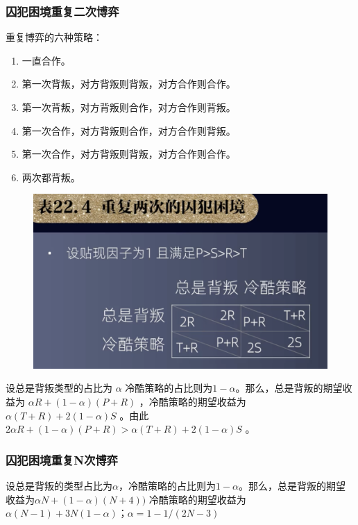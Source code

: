 \documentclass[12pt, a4paper]{article} %
\begin{document}
\begin{CJK*}{UTF8}{gbsn}
        \subsubsection{囚犯困境重复二次博弈}
        重复博弈的六种策略：\par
        \begin{enumerate}
            \item 一直合作。
            \item 第一次背叛，对方背叛则背叛，对方合作则合作。
            \item 第一次背叛，对方背叛则合作，对方合作则背叛。
            \item 第一次合作，对方背叛则合作，对方合作则背叛。
            \item 第一次合作，对方背叛则背叛，对方合作则合作。
            \item 两次都背叛。
        \end{enumerate}

        \begin{figure}[htbp]
            \includegraphics[width=1\textwidth]{./figures/catch2023-08-05-18.11.12.png}
        \end{figure}

        设总是背叛类型的占比为 $\alpha$ 冷酷策略的占比则为$1- \alpha$。那么，总是背叛的期望收益为 $\alpha R+(1-\alpha)(P+R)$
        ，冷酷策略的期望收益为$\alpha (T+R) + 2(1-\alpha)S$ 。由此 $ 2 \alpha R+(1-\alpha)(P+R)>\alpha(T+R)+2(1-\alpha)S$ 。

        \subsubsection{囚犯困境重复N次博弈}

        设总是背叛的类型占比为$\alpha$，冷酷策略的占比则为$1-\alpha$。那么，总是背叛的期望收益为$\alpha N+(1-\alpha)(N+4))$
        冷酷策略的期望收益为$\alpha (N-1) + 3N(1-\alpha)$；$\alpha=1-1/(2N-3)$


\end{CJK*}
\end{document}
